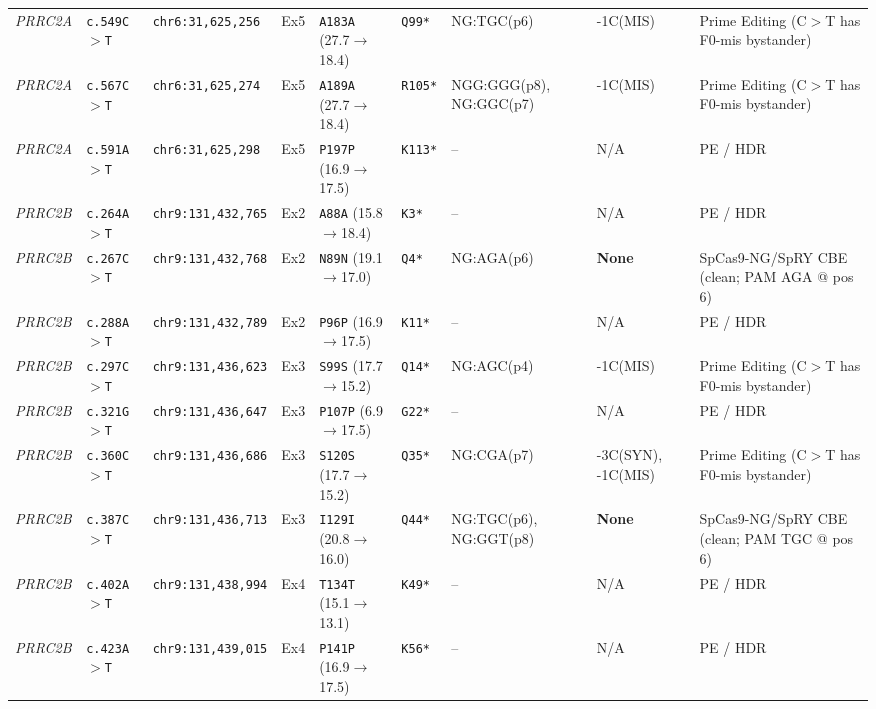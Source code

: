 \documentclass[10pt,letterpaper]{article}
\newcommand{\gene}[1]{\textit{#1}}
\begin{document}
{\begin{longtable}{@{}lllllllll@{}}
\gene{PRRC2A} & \texttt{c.549C$>$T} & \texttt{chr6:31,625,256} & Ex5 & \texttt{A183A} (27.7$\rightarrow$18.4) & \texttt{Q99*} & NG:TGC(p6) & -1C(MIS) & Prime Editing (C$>$T has F0-mis bystander) \\
\gene{PRRC2A} & \texttt{c.567C$>$T} & \texttt{chr6:31,625,274} & Ex5 & \texttt{A189A} (27.7$\rightarrow$18.4) & \texttt{R105*} & NGG:GGG(p8), NG:GGC(p7) & -1C(MIS) & Prime Editing (C$>$T has F0-mis bystander) \\
\gene{PRRC2A} & \texttt{c.591A$>$T} & \texttt{chr6:31,625,298} & Ex5 & \texttt{P197P} (16.9$\rightarrow$17.5) & \texttt{K113*} & -- & N/A & PE / HDR \\
\gene{PRRC2B} & \texttt{c.264A$>$T} & \texttt{chr9:131,432,765} & Ex2 & \texttt{A88A} (15.8$\rightarrow$18.4) & \texttt{K3*} & -- & N/A & PE / HDR \\
\gene{PRRC2B} & \texttt{c.267C$>$T} & \texttt{chr9:131,432,768} & Ex2 & \texttt{N89N} (19.1$\rightarrow$17.0) & \texttt{Q4*} & NG:AGA(p6) & \textbf{None} & SpCas9-NG/SpRY CBE (clean; PAM AGA @ pos 6) \\
\gene{PRRC2B} & \texttt{c.288A$>$T} & \texttt{chr9:131,432,789} & Ex2 & \texttt{P96P} (16.9$\rightarrow$17.5) & \texttt{K11*} & -- & N/A & PE / HDR \\
\gene{PRRC2B} & \texttt{c.297C$>$T} & \texttt{chr9:131,436,623} & Ex3 & \texttt{S99S} (17.7$\rightarrow$15.2) & \texttt{Q14*} & NG:AGC(p4) & -1C(MIS) & Prime Editing (C$>$T has F0-mis bystander) \\
\gene{PRRC2B} & \texttt{c.321G$>$T} & \texttt{chr9:131,436,647} & Ex3 & \texttt{P107P} (6.9$\rightarrow$17.5) & \texttt{G22*} & -- & N/A & PE / HDR \\
\gene{PRRC2B} & \texttt{c.360C$>$T} & \texttt{chr9:131,436,686} & Ex3 & \texttt{S120S} (17.7$\rightarrow$15.2) & \texttt{Q35*} & NG:CGA(p7) & -3C(SYN), -1C(MIS) & Prime Editing (C$>$T has F0-mis bystander) \\
\gene{PRRC2B} & \texttt{c.387C$>$T} & \texttt{chr9:131,436,713} & Ex3 & \texttt{I129I} (20.8$\rightarrow$16.0) & \texttt{Q44*} & NG:TGC(p6), NG:GGT(p8) & \textbf{None} & SpCas9-NG/SpRY CBE (clean; PAM TGC @ pos 6) \\
\gene{PRRC2B} & \texttt{c.402A$>$T} & \texttt{chr9:131,438,994} & Ex4 & \texttt{T134T} (15.1$\rightarrow$13.1) & \texttt{K49*} & -- & N/A & PE / HDR \\
\gene{PRRC2B} & \texttt{c.423A$>$T} & \texttt{chr9:131,439,015} & Ex4 & \texttt{P141P} (16.9$\rightarrow$17.5) & \texttt{K56*} & -- & N/A & PE / HDR \\

\end{longtable}}
\end{document}
